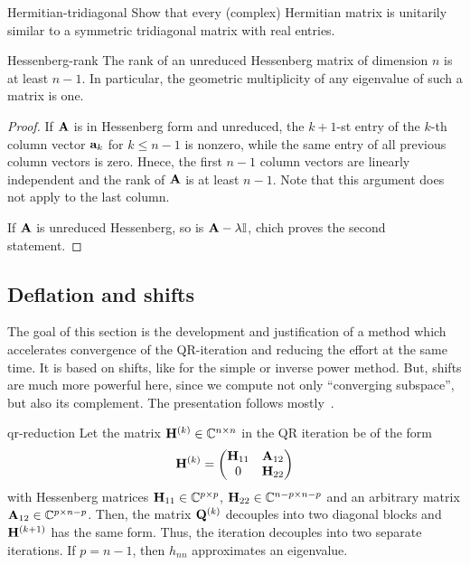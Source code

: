 \begin{Problem}{Hermitian-tridiagonal}
  Show that every (complex) Hermitian matrix is unitarily similar
  to a symmetric tridiagonal matrix with real entries.
\end{Problem}

\begin{Lemma}{Hessenberg-rank}
  The rank of an unreduced Hessenberg matrix of dimension $n$ is at
  least $n-1$. In particular, the geometric multiplicity of any
  eigenvalue of such a matrix is one.
\end{Lemma}

\begin{proof}
  If $\mathbf A$ is in Hessenberg form and unreduced, the $k+1$-st entry
  of the $k$-th column vector $\mathbf a_k$ for $k\le n-1$ is nonzero, while
  the same entry of all previous column vectors is zero. Hnece, the
  first $n-1$ column vectors are linearly independent and the rank of
  $\mathbf A$ is at least $n-1$. Note that this argument does not apply to
  the last column.

  If $\mathbf A$ is unreduced Hessenberg, so is $\mathbf A-\lambda\mathbb I$, chich
  proves the second statement.
\end{proof}

\subsection{Deflation and shifts}

\begin{intro}
  The goal of this section is the development and justification of a
  method which accelerates convergence of the QR-iteration and
  reducing the effort at the same time. It is based on shifts, like
  for the simple or inverse power method. But, shifts are much more
  powerful here, since we compute not only ``converging subspace'',
  but also its complement. The presentation follows
  mostly~\cite{GolubVanLoan83}.
\end{intro}

\begin{Theorem}{qr-reduction}
  Let the matrix $\mathbf H^{(k)}\in\mathbb C^{n\times n}$ in the QR iteration be of the
  form
  \begin{gather}
    \mathbf H^{(k)} =
    \begin{pmatrix}
      \mathbf H_{11} & \mathbf A_{12}\\0 & \mathbf H_{22}
    \end{pmatrix}
  \end{gather}
  with Hessenberg matrices $\mathbf H_{11}\in\mathbb C^{p\times p}$,
  $\mathbf H_{22}\in \mathbb C^{n-p\times n-p}$ and an arbitrary matrix
  $\mathbf A_{12}\in \mathbb C^{p\times n-p}$. Then, the matrix $\mathbf Q^{(k)}$
  decouples into two diagonal blocks and $\mathbf H^{(k+1)}$ has the same
  form. Thus, the iteration decouples into two separate iterations. If
  $p=n-1$, then $h_{nn}$ approximates an eigenvalue.
\end{Theorem}

